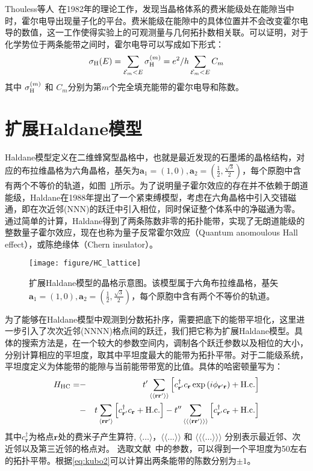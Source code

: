 Thouless等人~\cite{Thouless1982}在1982年的理论工作，发现当晶格体系的费米能级处在能隙当中时，霍尔电导出现量子化的平台。费米能级在能隙中的具体位置并不会改变霍尔电导的数值，这一工作使得实验上的可观测量与几何拓扑数相关联。可以证明，对于化学势位于两条能带之间时，霍尔电导可以写成如下形式：
\begin{equation*}
    \sigma_{\rm
H}({E})=\sum_{{\cal E}_{{m}}<E}\sigma_{\rm
H}^{(m)}=e^{2}/{h}\sum_{{\cal E}_{{m}}<E}C_{m}
\end{equation*}
其中 $\sigma_{\rm
H}^{(m)}$ 和 $C_{m}$分别为第$m$个完全填充能带的霍尔电导和陈数。


\section{扩展Haldane模型}
Haldane模型定义在二维蜂窝型晶格中，也就是最近发现的石墨烯的晶格结构，对应的布拉维晶格为六角晶格，基矢为$\textbf{a}_1=(1,0),\textbf{a}_2=(\frac{1}{2},\frac{\sqrt{3}}{2})$，每个原胞中含有两个不等价的轨道，如图~\ref{fig:HC_lattice}所示。为了说明量子霍尔效应的存在并不依赖于朗道能级，Haldane在1988年提出了一个紧束缚模型，考虑在六角晶格中引入交错磁通，即在次近邻(NNN)的跃迁中引入相位，同时保证整个体系中的净磁通为零。通过简单的计算，Haldane得到了两条陈数非零的拓扑能带，实现了无朗道能级的整数量子霍尔效应，现在也称为量子反常霍尔效应（Quantum anomoulous Hall effect），或陈绝缘体（Chern insulator）。

\begin{figure}
 \centering
 \texttt{[image: figure/HC\_lattice]}
 \caption{扩展Haldane模型的晶格示意图。该模型属于六角布拉维晶格，基矢$\textbf{a}_1=(1,0),\textbf{a}_2=(\frac{1}{2},\frac{\sqrt{3}}{2})$，每个原胞中含有两个不等价的轨道。}
 \label{fig:HC_lattice}
\end{figure}

为了能够在Haldane模型中观测到分数拓扑序，需要把底下的能带平坦化，这里进一步引入了次次近邻(NNNN)格点间的跃迁，我们把它称为扩展Haldane模型。具体的搜索方法是，在一个较大的参数空间内，调制各个跃迁参数以及相位的大小，分别计算相应的平坦度，取其中平坦度最大的能带为拓扑平带。对于二能级系统，平坦度定义为体能带的能隙与当前能带带宽的比值。具体的哈密顿量写为：
\begin{eqnarray}
H_{\rm HC}= &-&t^{\prime}\sum_{\langle\langle\mathbf{r}\mathbf{r}^{
\prime}\rangle\rangle}
\left[c^{\dagger}_{\mathbf{r}^{ \prime}}c_{\mathbf{r}}\exp\left(i\phi_{\mathbf{r}^{ \prime}\mathbf{r}}\right)+\textrm{H.c.}\right]\\
&-&t\sum_{\langle\mathbf{r}\mathbf{r}^{ \prime}\rangle}
\left[c^{\dagger}_{\mathbf{r}^{\prime}}c_{\mathbf{r}}+\textrm{H.c.}\right]
-t^{\prime\prime}\sum_{\langle\langle\langle\mathbf{r}\mathbf{r}^{
\prime}\rangle\rangle\rangle}
\left[c^{\dagger}_{\mathbf{r}^{\prime}}c_{\mathbf{r}}+\textrm{H.c.}\right]\nonumber
\label{eq:hc}
\end{eqnarray}
其中$c^{\dagger}_{\mathbf{r}}$为格点$\mathbf{r}$处的费米子产生算符,  $\langle\dots\rangle$，$\langle\langle\dots\rangle\rangle$ 和 $\langle\langle\langle\dots\rangle\rangle\rangle$ 分别表示最近邻、次近邻以及第三近邻的格点对。
选取文献~\cite{Wang2011}中的参数，可以得到一个平坦度为50左右的拓扑平带。根据\eqref{eq:kubo2}可以计算出两条能带的陈数分别为$\pm1$。

